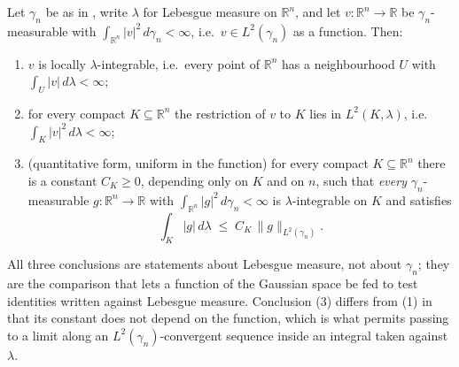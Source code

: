 \begin{lemma}
Let $\gamma_n$ be as in , write $\lambda$ for Lebesgue
measure on $\mathbb{R}^n$, and let $v : \mathbb{R}^n \to \mathbb{R}$ be
$\gamma_n$-measurable with $\int_{\mathbb{R}^n} |v|^2 \, d\gamma_n < \infty$,
i.e.\ $v \in L^2(\gamma_n)$ as a function.  Then:
\begin{enumerate}
\item $v$ is locally $\lambda$-integrable, i.e.\ every point of $\mathbb{R}^n$ has
a neighbourhood $U$ with $\int_U |v| \, d\lambda < \infty$;
\item for every compact $K \subseteq \mathbb{R}^n$ the restriction of $v$ to $K$
lies in $L^2(K,\lambda)$, i.e.\ $\int_K |v|^2 \, d\lambda < \infty$;
\item (quantitative form, uniform in the function) for every compact
$K \subseteq \mathbb{R}^n$ there is a constant $C_K \geq 0$, depending only on
$K$ and on $n$, such that \emph{every} $\gamma_n$-measurable
$g : \mathbb{R}^n \to \mathbb{R}$ with
$\int_{\mathbb{R}^n} |g|^2 \, d\gamma_n < \infty$ is $\lambda$-integrable on $K$
and satisfies
\[
  \int_K |g| \, d\lambda \;\leq\; C_K\, \|g\|_{L^2(\gamma_n)} .
\]
\end{enumerate}
All three conclusions are statements about Lebesgue measure, not about
$\gamma_n$; they are the comparison that lets a function of the Gaussian space
be fed to test identities written against Lebesgue measure.  Conclusion (3)
differs from (1) in that its constant does not depend on the function, which is
what permits passing to a limit along an $L^2(\gamma_n)$-convergent sequence
inside an integral taken against $\lambda$.
\end{lemma}
